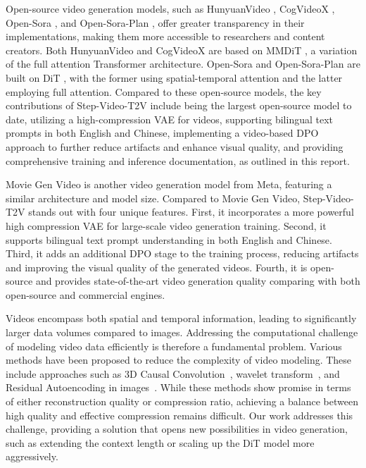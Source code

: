 Open-source video generation models, such as HunyuanVideo \cite{kong2024hunyuanvideo}, CogVideoX \cite{yang2024cogvideox}, Open-Sora \cite{opensora}, and Open-Sora-Plan \cite{lin2024open}, offer greater transparency in their implementations, making them more accessible to researchers and content creators. Both HunyuanVideo and CogVideoX are based on MMDiT \cite{esser2024scalingrectifiedflowtransformers}, a variation of the full attention Transformer architecture. Open-Sora and Open-Sora-Plan are built on DiT \cite{peebles2023scalablediffusionmodelstransformers}, with the former using spatial-temporal attention and the latter employing full attention. Compared to these open-source models, the key contributions of Step-Video-T2V include being the largest open-source model to date, utilizing a high-compression VAE for videos, supporting bilingual text prompts in both English and Chinese, implementing a video-based DPO approach to further reduce artifacts and enhance visual quality, and providing comprehensive training and inference documentation, as outlined in this report.

Movie Gen Video \cite{polyak2024moviegencastmedia} is another video generation model from Meta, featuring a similar architecture and model size. Compared to Movie Gen Video, Step-Video-T2V stands out with four unique features. First, it incorporates a more powerful high compression VAE for large-scale video generation training. Second, it supports bilingual text prompt understanding in both English and Chinese. Third, it adds an additional DPO stage to the training process, reducing
artifacts and improving the visual quality of the generated videos. Fourth, it is open-source and provides state-of-the-art video generation quality comparing with both open-source and commercial engines.

Videos encompass both spatial and temporal information, leading to significantly larger data volumes compared to images. Addressing the computational challenge of modeling video data efficiently is therefore a fundamental problem. Various methods have been proposed to reduce the complexity of video modeling. These include approaches such as 3D Causal Convolution~\citep{yu2024language,yang2024cogvideox,kong2024hunyuanvideo,opensora}, wavelet transform~\citep{agarwal2025cosmos,li2024wf}, and Residual Autoencoding in images~\citep{chen2025deep}. While these methods show promise in terms of either reconstruction quality or compression ratio, achieving a balance between high quality and effective compression remains difficult. Our work addresses this challenge, providing a solution that opens new possibilities in video generation, such as extending the context length or scaling up the DiT model more aggressively.